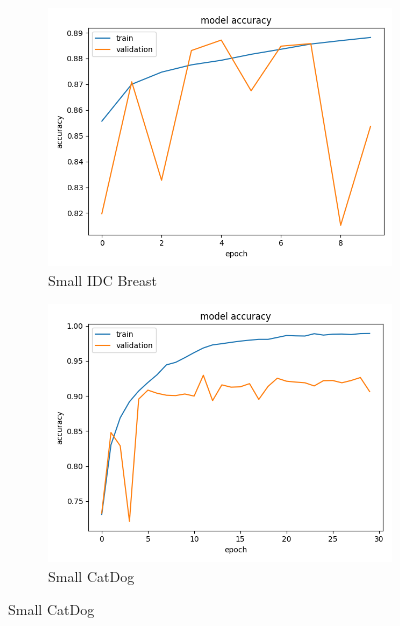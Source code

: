 \begin{figure}
\centering
\begin{subfigure}[b]{.45\linewidth}
\includegraphics[width=\linewidth]{Figs/small_breast_acc.jpg}
\caption{Small IDC Breast}
\end{subfigure}
\begin{subfigure}[b]{.45\linewidth}
\includegraphics[width=\linewidth]{Figs/small_catdog_acc.jpg}
\caption{Small CatDog}
\end{subfigure}


\end{figure}
